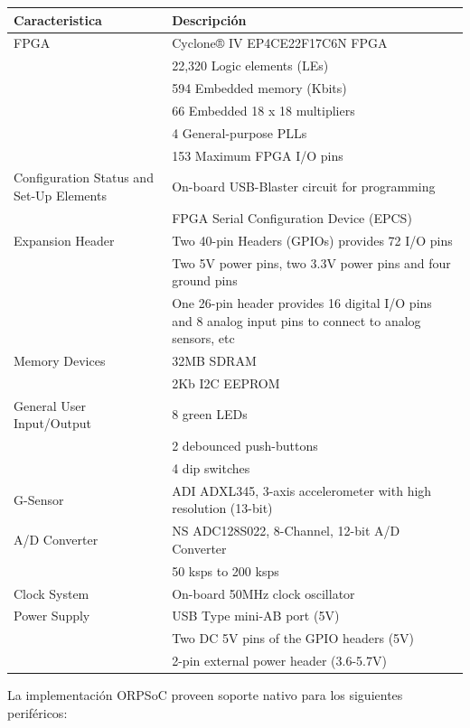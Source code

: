 				\begin{tabular}{ p{4cm} p{10cm} }
				\rowcolor[gray]{0.8} Caracteristica & Descripción \\		
				\hline FPGA   	& Cyclone® IV EP4CE22F17C6N FPGA\\
				\hline 			& 22,320 Logic elements (LEs)\\
				\hline 			& 594 Embedded memory (Kbits)\\
				\hline 			& 66 Embedded 18 x 18 multipliers\\
				\hline			& 4 General-purpose PLLs\\
				\hline 			& 153 Maximum FPGA I/O pins\\ 
				\hline Configuration Status and Set-Up Elements & 	On-board USB-Blaster circuit for programming\\
				\hline											&	FPGA Serial Configuration Device (EPCS)\\
				\hline Expansion Header & 	Two 40-pin Headers (GPIOs) provides 72 I/O pins\\
				\hline 					&	Two 5V power pins, two 3.3V power pins and four ground pins\\
				\hline 					&	One 26-pin header provides 16 digital I/O pins and 8 analog input pins to connect to analog sensors, etc\\ 
				\hline Memory Devices	&	32MB SDRAM\\
				\hline 					&	2Kb I2C EEPROM\\ 
				\hline General User Input/Output 	& 8 green LEDs\\
				\hline 								& 2 debounced push-buttons\\
				\hline 								& 4 dip switches\\ 
				\hline G-Sensor & ADI ADXL345, 3-axis accelerometer with high resolution (13-bit)\\ 
				\hline A/D Converter & NS ADC128S022, 8-Channel, 12-bit A/D Converter\\ 
				\hline					 & 50 ksps to 200 ksps \\
				\hline Clock System & On-board 50MHz clock oscillator\\
				\hline Power Supply & USB Type mini-AB port (5V)\\
				\hline 				& Two DC 5V pins of the GPIO headers (5V)\\
				\hline 				& 2-pin external power header (3.6-5.7V)\\
				\end{tabular}
				
				La implementación ORPSoC proveen soporte nativo para los siguientes periféricos:
				
